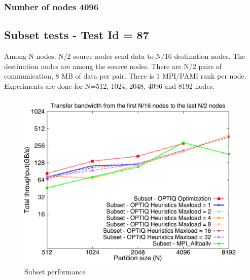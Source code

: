 \documentclass[letter]{article}
\begin{document}


\newpage

\subsubsection{Number of nodes 4096}





\newpage


%

%


\subsection{Subset tests - Test Id = 87}

Among N nodes, N/2 source nodes send data to N/16 destination nodes. The destination nodes are among the source nodes. There are N/2 pairs of communication, 8 MB of data per pair. There is 1 MPI/PAMI rank per node. Experiments are done for N=512, 1024, 2048, 4096 and 8192 nodes.

\begin{figure}[h]
\vspace{-0.1in}
\centering
\includegraphics[scale=0.50]{report_figures/constantr_87.pdf}
\vspace{-0.1in}
\caption{Subset performance}
\vspace{-0.1in}
\label{fig:patterns}
\end{figure}
\end{document}
